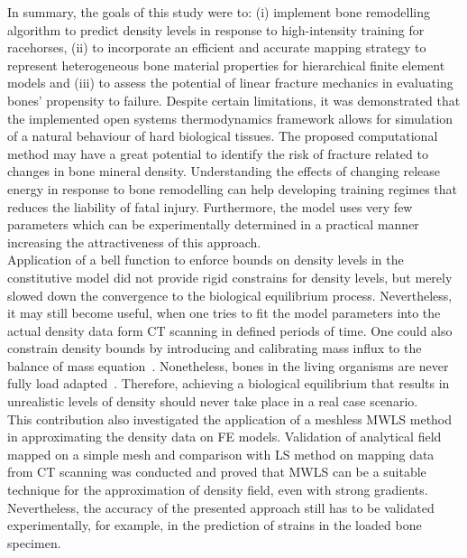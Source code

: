 \documentclass[11pt]{acmeArticle}
\numberwithin{equation}{section}
\begin{document}
In summary, the goals of this study were to: (i) implement bone remodelling algorithm to predict density levels in response to high-intensity training for racehorses, (ii) to incorporate an efficient and accurate mapping strategy to represent heterogeneous bone material properties for hierarchical finite element models and (iii) to assess the potential of linear fracture mechanics in evaluating bones' propensity to failure. 
Despite certain limitations, it was demonstrated that the implemented open systems thermodynamics framework allows for simulation of a natural behaviour of hard biological tissues. 
The proposed computational method may have a great potential to identify the risk of fracture related to changes in bone mineral density. 
Understanding the effects of changing release energy in response to bone remodelling can help developing training regimes that reduces the liability of fatal injury. 
Furthermore, the model uses very few parameters which can be experimentally determined in a practical manner increasing the attractiveness of this approach.\\ 

Application of a bell function to enforce bounds on density levels in the constitutive model did not provide rigid constrains for density levels, but merely slowed down the convergence to the biological equilibrium process. 
Nevertheless, it may still become useful, when one tries to fit the model parameters into the actual density data form CT scanning in defined periods of time. 
One could also constrain density bounds by introducing and calibrating mass influx to the balance of mass equation~\citep{sharma2013adaptive}. 
Nonetheless, bones in the living organisms are never fully load adapted~\citep{christen2014bone}. 
Therefore, achieving a biological equilibrium that results in unrealistic levels of density should never take place in a real case scenario. \\

This contribution also investigated the application of a meshless MWLS method in approximating the density data on FE models. Validation of analytical field mapped on a simple mesh and comparison with LS method on mapping data from CT scanning was conducted and proved that MWLS can be a suitable technique for the approximation of density field, even with strong gradients. 
Nevertheless, the accuracy of the presented approach still has to be validated experimentally, for example, in the prediction of strains in the loaded bone specimen.  \\
\end{document}
